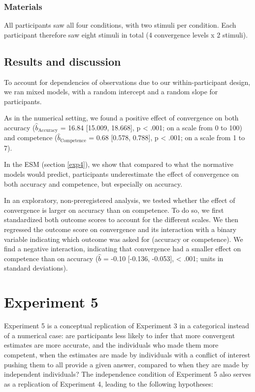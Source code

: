 \documentclass[
  doc,floatsintext]{apa6}
\begin{document}
\subsubsection{Materials}\label{materials-3}

All participants saw all four conditions, with two stimuli per condition. Each participant therefore saw eight stimuli in total (4 convergence levels x 2 stimuli).

\subsection{Results and discussion}\label{results-and-discussion-3}

To account for dependencies of observations due to our within-participant design, we ran mixed models, with a random intercept and a random slope for participants.

As in the numerical setting, we found a positive effect of convergence on both accuracy (\(\hat{b}_{\text{Accuracy}}\) = 16.84 {[}15.009, 18.668{]}, p \textless{} .001; on a scale from 0 to 100) and competence (\(\hat{b}_{\text{Competence}}\) = 0.68 {[}0.578, 0.788{]}, p \textless{} .001; on a scale from 1 to 7).

In the ESM (section \ref{exp4}), we show that compared to what the normative models would predict, participants underestimate the effect of convergence on both accuracy and competence, but especially on accuracy.

In an exploratory, non-preregistered analysis, we tested whether the effect of convergence is larger on accuracy than on competence. To do so, we first standardized both outcome scores to account for the different scales. We then regressed the outcome score on convergence and its interaction with a binary variable indicating which outcome was asked for (accuracy or competence). We find a negative interaction, indicating that convergence had a smaller effect on competence than on accuracy (\(\hat{b}\) = -0.10 {[}-0.136, -0.053{]}, \textless{} .001; units in standard deviations).

\section{Experiment 5}\label{experiment-5}

Experiment 5 is a conceptual replication of Experiment 3 in a categorical instead of a numerical case: are participants less likely to infer that more convergent estimates are more accurate, and the individuals who made them more competent, when the estimates are made by individuals with a conflict of interest pushing them to all provide a given answer, compared to when they are made by independent individuals? The independence condition of Experiment 5 also serves as a replication of Experiment 4, leading to the following hypotheses:
\end{document}
